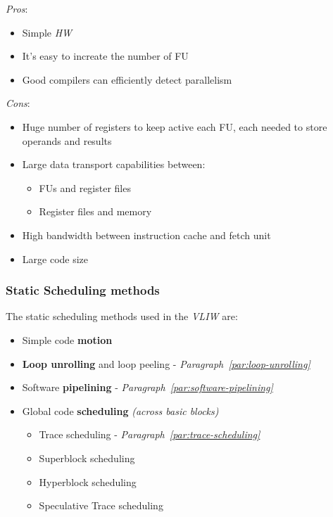 \documentclass[english]{article}
\begin{document}
\textit{Pros}:
\begin{itemize}
  \item Simple \textit{HW}
  \item It's easy to increate the number of FU
  \item Good compilers can efficiently detect parallelism
\end{itemize}

\bigskip
\textit{Cons}:
\begin{itemize}
  \item Huge number of registers to keep active each FU, each needed to store operands and results
  \item Large data transport capabilities between:
        \begin{itemize}
          \item FUs and register files
          \item Register files and memory
        \end{itemize}
  \item High bandwidth between instruction cache and fetch unit
  \item Large code size
\end{itemize}

\subsubsection{Static Scheduling methods}

The static scheduling methods used in the \textit{VLIW} are:

\begin{itemize}
  \item Simple code \textbf{motion}
  \item \textbf{Loop unrolling} and loop peeling - \textit{Paragraph~\ref{par:loop-unrolling}}
  \item Software \textbf{pipelining} - \textit{Paragraph~\ref{par:software-pipelining}}
  \item Global code \textbf{scheduling} \textit{(across basic blocks)}
        \begin{itemize}
          \item Trace scheduling - \textit{Paragraph~\ref{par:trace-scheduling}}
          \item Superblock scheduling
          \item Hyperblock scheduling
          \item Speculative Trace scheduling
        \end{itemize}
\end{itemize}
\end{document}
